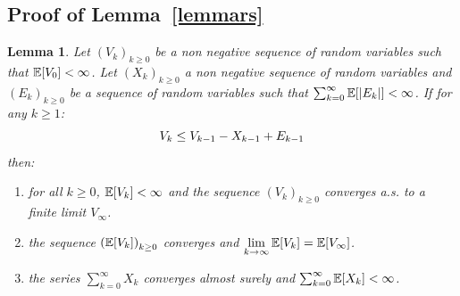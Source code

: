 \documentclass{article}
\newtheorem*{Lemma*}{Lemma}
\begin{document}
\vspace{0.2in}

\subsection{Proof of Lemma~\ref{lemmars}}\label{appendix:lemma}
\begin{Lemma*}
Let $\left(V_k \right)_{k\geq0}$ be a non negative sequence of random variables such that $\EE[V_0] < \infty$. Let $\left(X_k \right)_{k\geq0}$ a non negative sequence of random variables and $\left(E_k \right)_{k \geq 0}$ be a sequence of random variables such that $\sum_{k=0}^{\infty}{\EE[|E_k|]} < \infty$. If for any $k \geq 1$:
\begin{equation}\notag
V_{k} \leq V_{k-1} - X_{k-1} + E_{k-1}
\end{equation}
 then:
\begin{enumerate}[label=(\roman*)]
\item for all $k \geq 0$, $\EE[V_k] < \infty$ and the sequence $\left(V_k \right)_{k\geq0}$  converges a.s. to a finite limit $V_{\infty}$.
\item the sequence $\left(\EE[V_k] \right)_{k\geq0}$ converges and $\lim \limits_{k \to \infty}\EE[V_k] = \EE[V_{\infty}] $.
\item the series $\sum_{k=0}^{\infty}{X_k}$ converges almost surely and $\sum_{k=0}^{\infty}{\EE[X_k]}< \infty$.
\end{enumerate}
\end{Lemma*}
\end{document}
